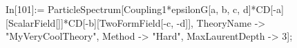 In[101]:= ParticleSpectrum[Coupling1*epsilonG[a, b, c, d]*CD[-a][ScalarField[]]*CD[-b][TwoFormField[-c, -d]], TheoryName -> "MyVeryCoolTheory", Method -> "Hard", MaxLaurentDepth -> 3]; 